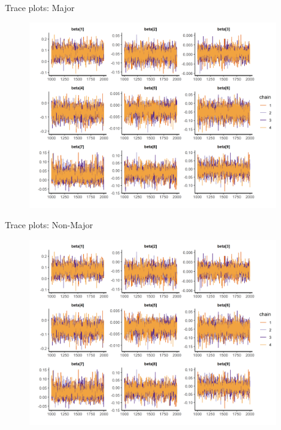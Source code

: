 \documentclass[12pt]{beamer}
\begin{document}
\begin{frame}{Trace plots: Major}

\begin{figure}
	\centering
		\includegraphics[width=0.95\textwidth]{beta-trace-maj.png}
\end{figure}


\end{frame}


\begin{frame}{Trace plots: Non-Major}

\begin{figure}
	\centering
		\includegraphics[width=0.95\textwidth]{beta-trace-maj.png}
\end{figure}


\end{frame}
\end{document}
